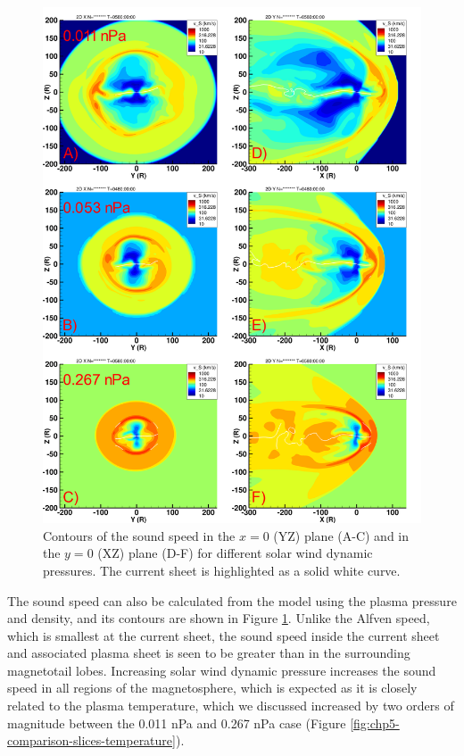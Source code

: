 \begin{figure}
    \centering
    \includegraphics[height=0.9\textheight]{images5/compare_runs_currentsheet_SoundSpeed.png}
    \caption{Contours of the sound speed in the $x=0$ (YZ) plane (A-C) and in the $y=0$ (XZ) plane (D-F) for different solar wind dynamic pressures. The current sheet is highlighted as a solid white curve.}
    \label{fig:chp5-comparison-slices-sound}
\end{figure}

The sound speed can also be calculated from the model using the plasma pressure and density, and its contours are shown in Figure \ref{fig:chp5-comparison-slices-sound}. Unlike the Alfven speed, which is smallest at the current sheet, the sound speed inside the current sheet and associated plasma sheet is seen to be greater than in the surrounding magnetotail lobes. Increasing solar wind dynamic pressure increases the sound speed in all regions of the magnetosphere, which is expected as it is closely related to the plasma temperature, which we discussed increased by two orders of magnitude between the 0.011 nPa and 0.267 nPa case (Figure \ref{fig:chp5-comparison-slices-temperature}). 

